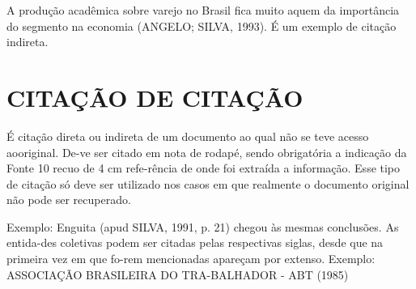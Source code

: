 A produção acadêmica sobre varejo no Brasil fica muito aquem da
importância do segmento na economia (ANGELO; SILVA, 1993). É um exemplo de citação indireta.

\section{CITAÇÃO DE CITAÇÃO}

É citação direta ou indireta de um documento ao qual não se teve
acesso aooriginal. De-ve ser citado em nota de rodapé, sendo obrigatória a indicação da Fonte 10 recuo de 4 cm refe-rência de onde foi extraída a informação. Esse tipo de citação só deve ser utilizado nos casos em que realmente o documento original não pode ser recuperado. 

Exemplo: Enguita (apud SILVA, 1991, p. 21) chegou às mesmas
conclusões. As entida-des coletivas podem ser citadas pelas respectivas siglas, desde que na primeira vez em que fo-rem mencionadas apareçam por extenso. Exemplo: ASSOCIAÇÃO BRASILEIRA DO TRA-BALHADOR - ABT (1985)


